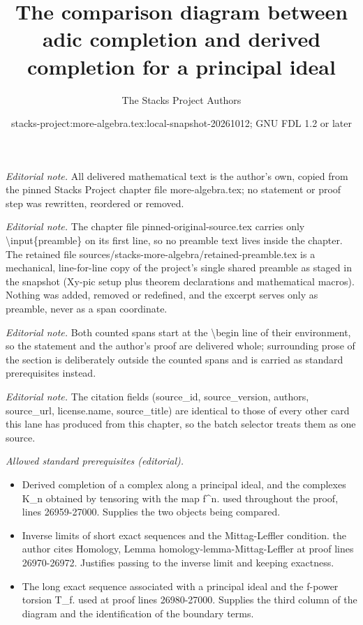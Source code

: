 \documentclass[10pt,a4paper]{amsart}
\title{The comparison diagram between adic completion and derived completion for a principal ideal}
\author{The Stacks Project Authors}
\date{stacks-project:more-algebra.tex:local-snapshot-20261012; GNU FDL 1.2 or later}
\theoremstyle{plain}
\theoremstyle{definition}
\theoremstyle{remark}
\numberwithin{equation}{subsection}
\begin{document}
\maketitle
\setcounter{subsection}{1}
\noindent\textit{Editorial note.} All delivered mathematical text is the author's own, copied from the pinned Stacks Project chapter file more-algebra.tex; no statement or proof step was rewritten, reordered or removed.\par\medskip
\noindent\textit{Editorial note.} The chapter file pinned-original-source.tex carries only \textbackslash{}input\{preamble\} on its first line, so no preamble text lives inside the chapter. The retained file sources/stacks-more-algebra/retained-preamble.tex is a mechanical, line-for-line copy of the project's single shared preamble as staged in the snapshot (Xy-pic setup plus theorem declarations and mathematical macros). Nothing was added, removed or redefined, and the excerpt serves only as preamble, never as a span coordinate.\par\medskip
\noindent\textit{Editorial note.} Both counted spans start at the \textbackslash{}begin line of their environment, so the statement and the author's proof are delivered whole; surrounding prose of the section is deliberately outside the counted spans and is carried as standard prerequisites instead.\par\medskip
\noindent\textit{Editorial note.} The citation fields (source\_id, source\_version, authors, source\_url, license.name, source\_title) are identical to those of every other card this lane has produced from this chapter, so the batch selector treats them as one source.\par\medskip
\noindent\textit{Allowed standard prerequisites (editorial).}\begin{itemize}
\item Derived completion of a complex along a principal ideal, and the complexes K\_n obtained by tensoring with the map f\textasciicircum{}n. used throughout the proof, lines 26959-27000. Supplies the two objects being compared.
\item Inverse limits of short exact sequences and the Mittag-Leffler condition. the author cites Homology, Lemma homology-lemma-Mittag-Leffler at proof lines 26970-26972. Justifies passing to the inverse limit and keeping exactness.
\item The long exact sequence associated with a principal ideal and the f-power torsion T\_f. used at proof lines 26980-27000. Supplies the third column of the diagram and the identification of the boundary terms.
\end{itemize}\medskip
\end{document}

